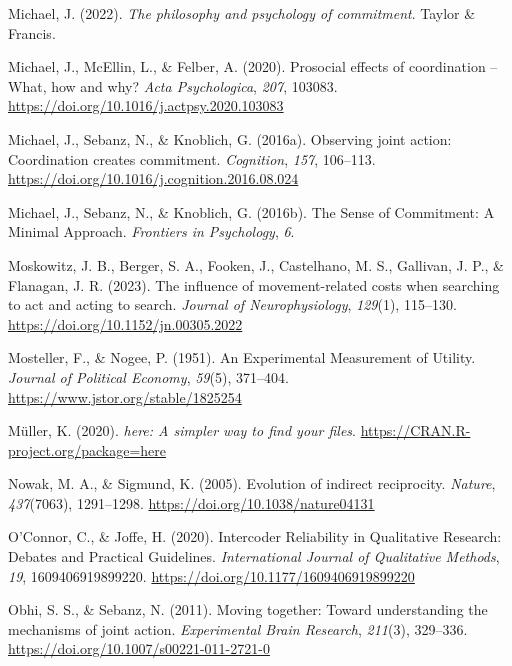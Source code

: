 \documentclass[
  man,
  floatsintext,
  longtable,
  nolmodern,
  notxfonts,
  notimes,
  mask,
  colorlinks=true,linkcolor=blue,citecolor=blue,urlcolor=blue]{apa7}
\newlength{\cslhangindent}
\newenvironment{CSLReferences}[2] %
 {\begin{list}{}{%
  \setlength{\itemindent}{0pt}
  \setlength{\leftmargin}{0pt}
  \setlength{\parsep}{0pt}
  \ifodd #1
   \setlength{\leftmargin}{\cslhangindent}
   \setlength{\itemindent}{-1\cslhangindent}
  \fi
  \setlength{\itemsep}{#2\baselineskip}}}
 {\end{list}}
\begin{document}
\begin{CSLReferences}{1}{0}
Michael, J. (2022). \emph{The philosophy and psychology of commitment}.
Taylor \& Francis.

Michael, J., McEllin, L., \& Felber, A. (2020). Prosocial effects of
coordination -- {What}, how and why? \emph{Acta Psychologica},
\emph{207}, 103083. \url{https://doi.org/10.1016/j.actpsy.2020.103083}

Michael, J., Sebanz, N., \& Knoblich, G. (2016a). Observing joint
action: {Coordination} creates commitment. \emph{Cognition}, \emph{157},
106--113. \url{https://doi.org/10.1016/j.cognition.2016.08.024}

Michael, J., Sebanz, N., \& Knoblich, G. (2016b). The {Sense} of
{Commitment}: {A Minimal Approach}. \emph{Frontiers in Psychology},
\emph{6}.

Moskowitz, J. B., Berger, S. A., Fooken, J., Castelhano, M. S.,
Gallivan, J. P., \& Flanagan, J. R. (2023). The influence of
movement-related costs when searching to act and acting to search.
\emph{Journal of Neurophysiology}, \emph{129}(1), 115--130.
\url{https://doi.org/10.1152/jn.00305.2022}

Mosteller, F., \& Nogee, P. (1951). An {Experimental Measurement} of
{Utility}. \emph{Journal of Political Economy}, \emph{59}(5), 371--404.
\url{https://www.jstor.org/stable/1825254}

Müller, K. (2020). \emph{{here}: A simpler way to find your files}.
\url{https://CRAN.R-project.org/package=here}

Nowak, M. A., \& Sigmund, K. (2005). Evolution of indirect reciprocity.
\emph{Nature}, \emph{437}(7063), 1291--1298.
\url{https://doi.org/10.1038/nature04131}

O'Connor, C., \& Joffe, H. (2020). Intercoder {Reliability} in
{Qualitative Research}: {Debates} and {Practical Guidelines}.
\emph{International Journal of Qualitative Methods}, \emph{19},
1609406919899220. \url{https://doi.org/10.1177/1609406919899220}

Obhi, S. S., \& Sebanz, N. (2011). Moving together: Toward understanding
the mechanisms of joint action. \emph{Experimental Brain Research},
\emph{211}(3), 329--336. \url{https://doi.org/10.1007/s00221-011-2721-0}


\end{CSLReferences}
\end{document}
